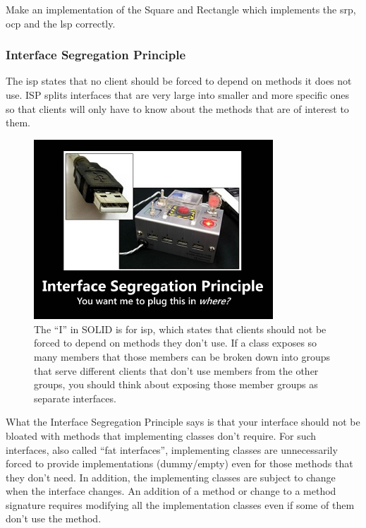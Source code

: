 \begin{exercise}
	Make an implementation of the Square and Rectangle which implements the \gls{srp},  \gls{ocp}  and the \gls{lsp} correctly. 
\end{exercise}

\subsubsection{Interface Segregation Principle}

\begin{framed}
	The \gls{isp} states that no client should be forced to depend on methods it does not use. ISP splits interfaces that are very large into smaller and more specific ones so that clients will only have to know about the methods that are of interest to them.
\end{framed}

\begin{figure}
	\centering
	\includegraphics[width=0.8\textwidth]{images/kotlin/ISP.jpg}
	\caption{The “I” in SOLID is for \gls{isp}, which states that clients should not be forced to depend on methods they don’t use. If a class exposes so many members that those members can be broken down into groups that serve different clients that don’t use members from the other groups, you should think about exposing those member groups as separate interfaces.}
	\label{fir:lsp}
\end{figure}

What the Interface Segregation Principle says is that your interface should not be bloated with methods that implementing classes don’t require. For such interfaces, also called “fat interfaces”, implementing classes are unnecessarily forced to provide implementations (dummy/empty) even for those methods that they don’t need. In addition, the implementing classes are subject to change when the interface changes. An addition of a method or change to a method signature requires modifying all the implementation classes even if some of them don’t use the method.

